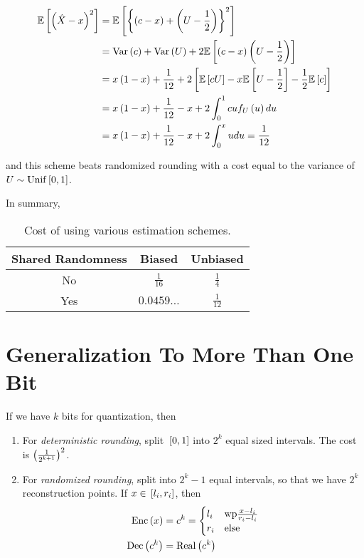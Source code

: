 \documentclass[twoside]{article}
\begin{document}
\begin{align}
    \mathbb{E}\left[ \left(\hat{X}-x\right)^2 \right] &= \mathbb{E}\left[ \left\{\left(c-x\right)+\left(U-\frac{1}{2}\right)\right\}^2 \right] \\
                              &= \mathrm{Var}\left(c\right) + \mathrm{Var}\left(U\right) + 2\mathbb{E}\left[ \left(c-x\right)\left(U-\frac{1}{2}\right) \right] \\
                              &= x\left(1-x\right) + \frac{1}{12} + 2{}\left[\mathbb{E}\left[ cU \right]-x\mathbb{E}\left[ U-\frac{1}{2} \right]-\frac{1}{2}\mathbb{E}\left[ c \right]\right] \\
                              &= x\left(1-x\right) + \frac{1}{12} - x + 2\int_0^1cuf_U\left(u\right)du \\
                              &= x\left(1-x\right) + \frac{1}{12} - x + 2\int_0^xudu = \frac{1}{12}
\end{align}

and this scheme beats randomized rounding with a cost equal to the variance of \(U\sim\mathrm{Unif}{}\left[0,1\right]\).

In summary,

\begin{table}[!ht]
    \centering
    \begin{tabular}{|c|c|c|}
        \hline
        \textbf{Shared Randomness} & \textbf{Biased} & \textbf{Unbiased} \\
        \hline
        No & \(\frac{1}{16}\) & \(\frac{1}{4}\) \\
        \hline
        Yes & \(0.0459\ldots\) & \(\frac{1}{12}\) \\
        \hline
    \end{tabular}
    \caption{Cost of using various estimation schemes.}
    \label{tab:cost-est}
\end{table}

\section{Generalization To More Than One Bit}

If we have \(k\) bits for quantization, then

\begin{enumerate}
    \item For \emph{deterministic rounding}, split \({}\left[0,1\right]\) into \(2^k\) equal sized intervals. The cost is \(\left(\frac{1}{2^{k+1}}\right)^2\).
    \item For \emph{randomized rounding}, split into \(2^k-1\) equal intervals, so that we have \(2^k\) reconstruction points. If \(x\in{}\left[l_i,r_i\right]\), then
        \begin{align}
            \mathrm{Enc}\left(x\right) &= c^k =
            \begin{cases}
                l_i & \textrm{wp} \frac{x-l_i}{r_i-l_i} \\
                r_i & \textrm{else}
            \end{cases} \\
            \mathrm{Dec}\left(c^k\right) &= \mathrm{Real}\left(c^k\right)
        \end{align}
\end{enumerate}
\end{document}
